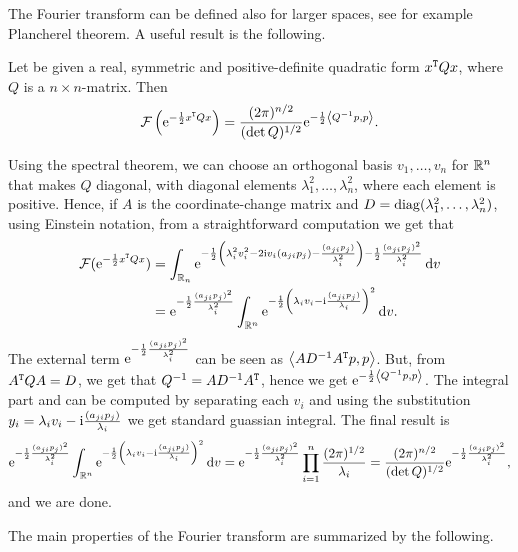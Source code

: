 The Fourier transform can be defined also for larger spaces, see for example Plancherel theorem. A useful result is the following.

\begin{nlem}
Let be given a real, symmetric and positive-definite quadratic form $x^{\operatorname{\mathtt{T}}}Qx$, where $Q$ is a $n\times n$-matrix. Then
\[
\operatorname{\mathcal{F}}\left(\mathrm{e}^{-\frac{1}{2}x^{\operatorname{\mathtt{T}}}Qx}\right)=\frac{(2\pi)^{n/2}}{(\det Q)^{1/2}}\mathrm{e}^{-\frac{1}{2}\left< Q^{-1}p,p\right>}.
\]
\end{nlem}
\begin{prf}
Using the spectral theorem, we can choose an orthogonal basis $v_{1},\ldots, v_{n}$ for $\mathbb{R}^{n}$ that makes $Q$ diagonal, with diagonal elements $\lambda_{1}^{2},\ldots,\lambda_{n}^{2}$, where each element is positive. Hence, if $A$ is the coordinate-change matrix and $D=\operatorname{diag}(\lambda_{1}^{2},\ldots,\lambda_{n}^{2})$, using Einstein notation, from a straightforward computation we get that
\begin{align*}
\operatorname{\mathcal{F}}(\mathrm{e}^{-\frac{1}{2}x^{\operatorname{\mathtt{T}}}Qx})&=\int_{\mathbb{R}_{n}}\mathrm{e}^{-\frac{1}{2}\left(\lambda_{i}^{2}v_{i}^{2}-2\mathrm{i} v_{i}(a_{ji}p_{j})-\frac{(a_{ji}p_{j})}{\lambda_{i}^{2}}\right)-\frac{1}{2}\frac{(a_{ji}p_{j})^{2}}{\lambda_{i}^{2}}}\mathop{}\!\mathrm{d} v\\
&=\mathrm{e}^{-\frac{1}{2}\frac{(a_{ji}p_{j})^{2}}{\lambda_{i}^{2}}}\int_{\mathbb{R}^{n}}\mathrm{e}^{-\frac{1}{2}\left(\lambda_{i}v_{i}-\mathrm{i}\frac{(a_{ji}p_{j})}{\lambda_{i}}\right)^{2}}\mathop{}\!\mathrm{d} v.
\end{align*}
The external term $\mathrm{e}^{-\frac{1}{2}\frac{(a_{ji}p_{j})^{2}}{\lambda_{i}^{2}}}$ can be seen as $\left< AD^{-1}A^{\operatorname{\mathtt{T}}}p,p\right>$. But, from $A^{\operatorname{\mathtt{T}}}Q A=D$, we get that $Q^{-1}=AD^{-1}A^{\operatorname{\mathtt{T}}}$, hence we get $\mathrm{e}^{-\frac{1}{2}\left< Q^{-1}p,p\right>}$. The integral part and can be computed by separating each $v_{i}$ and using the substitution $y_{i}=\lambda_{i}v_{i}-\mathrm{i}\frac{(a_{ji}p_{j})}{\lambda_{i}}$ we get standard guassian integral. The final result is 
\[
\mathrm{e}^{-\frac{1}{2}\frac{(a_{ji}p_{j})^{2}}{\lambda_{i}^{2}}}\int_{\mathbb{R}^{n}}\mathrm{e}^{-\frac{1}{2}\left(\lambda_{i}v_{i}-\mathrm{i}\frac{(a_{ji}p_{j})}{\lambda_{i}}\right)^{2}}\mathop{}\!\mathrm{d} v=\mathrm{e}^{-\frac{1}{2}\frac{(a_{ji}p_{j})^{2}}{\lambda_{i}^{2}}}\prod_{i=1}^{n}\frac{(2\pi)^{1/2}}{\lambda_{i}}=\frac{(2\pi)^{n/2}}{(\det Q)^{1/2}}\mathrm{e}^{-\frac{1}{2}\frac{(a_{ji}p_{j})^{2}}{\lambda_{i}^{2}}},
\]
and we are done.
\end{prf}


The main properties of the Fourier transform are summarized by the following.


